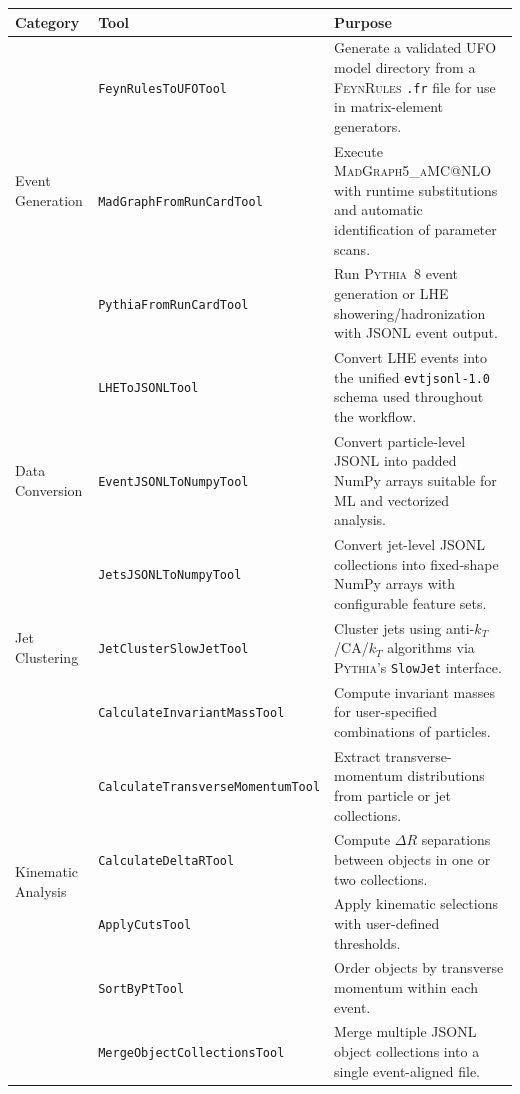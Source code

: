 \documentclass[11pt,oneside]{article}
\numberwithin{equation}{section}
\begin{document}
\begin{appendix}
\begin{table}[p!]
\centering
\begin{sideways}
\begin{tabular}{llp{10cm}}
\hline
\textbf{Category} & \textbf{Tool} & \textbf{Purpose} \\
\hline
\multirow{3}{*}{Event Generation}
  & \texttt{FeynRulesToUFOTool} & Generate a validated UFO model directory from a \textsc{FeynRules} \texttt{.fr} file for use in matrix-element generators. \\
  & \texttt{MadGraphFromRunCardTool} & Execute \textsc{MadGraph5\_aMC@NLO} with runtime substitutions and automatic identification of parameter scans. \\
  & \texttt{PythiaFromRunCardTool} & Run \textsc{Pythia}~8 event generation or LHE showering/hadronization with JSONL event output. \\
\hline
\multirow{3}{*}{Data Conversion}
  & \texttt{LHEToJSONLTool} & Convert LHE events into the unified \texttt{evtjsonl-1.0} schema used throughout the workflow. \\
  & \texttt{EventJSONLToNumpyTool} & Convert particle-level JSONL into padded NumPy arrays suitable for ML and vectorized analysis. \\
  & \texttt{JetsJSONLToNumpyTool} & Convert jet-level JSONL collections into fixed-shape NumPy arrays with configurable feature sets. \\
\hline
Jet Clustering
  & \texttt{JetClusterSlowJetTool} & Cluster jets using anti-$k_T$/CA/$k_T$ algorithms via \textsc{Pythia}'s \texttt{SlowJet} interface. \\
\hline
\multirow{7}{*}{Kinematic Analysis}
  & \texttt{CalculateInvariantMassTool} & Compute invariant masses for user-specified combinations of particles. \\
  & \texttt{CalculateTransverseMomentumTool} & Extract transverse-momentum distributions from particle or jet collections. \\
  & \texttt{CalculateDeltaRTool} & Compute $\Delta R$ separations between objects in one or two collections. \\
  & \texttt{ApplyCutsTool} & Apply kinematic selections with user-defined thresholds. \\
  & \texttt{SortByPtTool} & Order objects by transverse momentum within each event. \\
  & \texttt{MergeObjectCollectionsTool} & Merge multiple JSONL object collections into a single event-aligned file. \\

\end{tabular}
\end{sideways}
\end{table}
\end{appendix}
\end{document}
